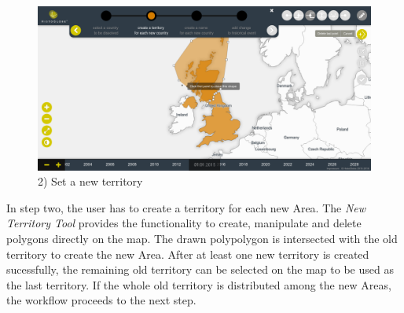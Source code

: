 \begin{minipage}[t]{0.47\textwidth}

  \begin{figure}[H]
    \centering
    \includegraphics[width=1.0\textwidth]{graphics/development/user_interface_design_process/4_set_new_territories.png}
    \caption{2) Set a new territory}
    \label{fig:final_4_set_new_territories}
  \end{figure}

  In step two, the user has to create a territory for each new Area. The \emph{New Territory Tool} provides the functionality to create, manipulate and delete polygons directly on the map. The drawn polypolygon is intersected with the old territory to create the new Area. After at least one new territory is created sucessfully, the remaining old territory can be selected on the map to be used as the last territory. If the whole old territory is distributed among the new Areas, the workflow proceeds to the next step.

\end{minipage}

